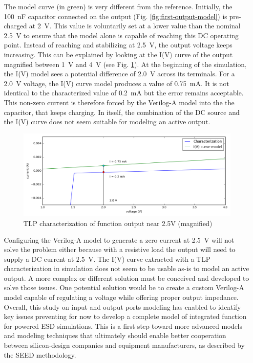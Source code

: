 The model curve (in green) is very different from the reference.
Initially, the \SI{100}{\nano\farad} capacitor connected on the output (Fig. \ref{fig:first-output-model}) is pre-charged at \SI{2}{\volt}.
This value is voluntarily set at a lower value than the nominal \SI{2.5}{\volt} to ensure that the model alone is capable of reaching this DC operating point.
Instead of reaching and stabilizing at \SI{2.5}{\volt}, the output voltage keeps increasing.
This can be explained by looking at the I(V) curve of the output magnified between \SI{1}{\volt} and \SI{4}{\volt} (see Fig. \ref{fig:tlp-output-cz-zoomed}).
At the beginning of the simulation, the I(V) model sees a potential difference of \SI{2.0}{\volt} across its terminals.
For a \SI{2.0}{\volt} voltage, the I(V) curve model produces a value of \SI{0.75}{\milli\ampere}.
It is not identical to the characterized value of \SI{0.2}{\milli\ampere} but the error remains acceptable.
This non-zero current is therefore forced by the Verilog-A model into the the capacitor, that keeps charging.
In itself, the combination of the DC source and the I(V) curve does not seem suitable for modeling an active output.

\begin{figure}[!h]
  \centering
  \includegraphics[width=\textwidth]{src/4/figures/tlp_output_characterization_magnified.png}
  \caption{TLP characterization of function output near 2.5V (magnified)}
  \label{fig:tlp-output-cz-zoomed}
\end{figure}

Configuring the Verilog-A model to generate a zero current at \SI{2.5}{\volt} will not solve the problem either because with a resistive load the output will need to supply a DC current at \SI{2.5}{\volt}.
The I(V) curve extracted with a TLP characterization in simulation does not seem to be usable as-is to model an active output.
A more complex or different solution must be conceived and developed to solve those issues.
One potential solution would be to create a custom Verilog-A model capable of regulating a voltage while offering proper output impedance.
Overall, this study on input and output ports modeling has enabled to identify key issues preventing for now to develop a complete model of integrated function for powered ESD simulations.
This is a first step toward more advanced models and modeling techniques that ultimately should enable better cooperation between silicon-design companies and equipment manufacturers, as described by the SEED methodology.

